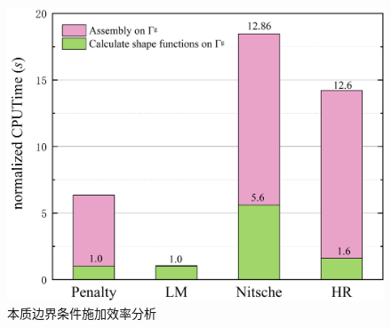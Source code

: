 \begin{figure}[H]
    \centering
    \includegraphics[scale=0.5]{figure/E/cantilever/caculate.png}
    \caption{本质边界条件施加效率分析}\label{Ccaculate}
\end{figure}
